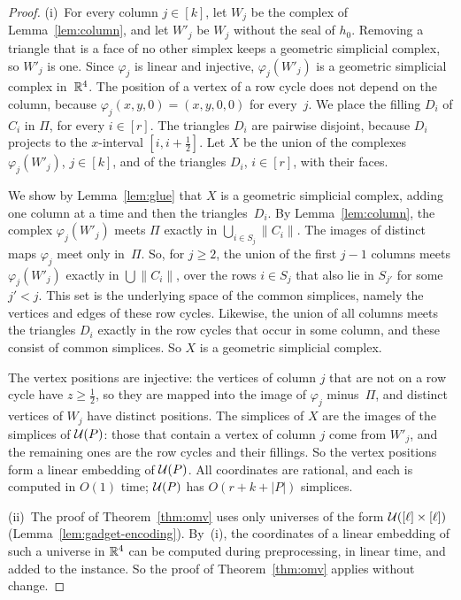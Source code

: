 \begin{proof}
(i)~For every column $j\in[k]$, let $W_j$ be the complex of Lemma~\ref{lem:column}, and let $W'_j$ be $W_j$ without the seal of $h_0$.
Removing a triangle that is a face of no other simplex keeps a geometric simplicial complex, so $W'_j$ is one.
Since $\varphi_j$ is linear and injective, $\varphi_j(W'_j)$ is a geometric simplicial complex in~$\mathbb{R}^4$.
The position of a vertex of a row cycle does not depend on the column, because $\varphi_j(x,y,0)=(x,y,0,0)$ for every~$j$.
We place the filling $D_i$ of $C_i$ in $\Pi$, for every $i\in[r]$.
The triangles $D_i$ are pairwise disjoint, because $D_i$ projects to the $x$-interval $[i,i+\frac12]$.
Let $X$ be the union of the complexes $\varphi_j(W'_j)$, $j\in[k]$, and of the triangles $D_i$, $i\in[r]$, with their faces.

We show by Lemma~\ref{lem:glue} that $X$ is a geometric simplicial complex, adding one column at a time and then the triangles~$D_i$.
By Lemma~\ref{lem:column}, the complex $\varphi_j(W'_j)$ meets $\Pi$ exactly in $\bigcup_{i\in S_j}\lVert C_i\rVert$.
The images of distinct maps $\varphi_j$ meet only in~$\Pi$.
So, for $j\ge2$, the union of the first $j-1$ columns meets $\varphi_j(W'_j)$ exactly in $\bigcup\lVert C_i\rVert$, over the rows $i\in S_j$ that also lie in $S_{j'}$ for some $j'<j$.
This set is the underlying space of the common simplices, namely the vertices and edges of these row cycles.
Likewise, the union of all columns meets the triangles $D_i$ exactly in the row cycles that occur in some column, and these consist of common simplices.
So $X$ is a geometric simplicial complex.

The vertex positions are injective: the vertices of column $j$ that are not on a row cycle have $z\ge\frac12$, so they are mapped into the image of $\varphi_j$ minus~$\Pi$, and distinct vertices of $W_j$ have distinct positions.
The simplices of $X$ are the images of the simplices of $\mathcal{U}(P)$: those that contain a vertex of column $j$ come from $W'_j$, and the remaining ones are the row cycles and their fillings.
So the vertex positions form a linear embedding of $\mathcal{U}(P)$.
All coordinates are rational, and each is computed in $O(1)$ time; $\mathcal{U}(P)$ has $O(r+k+|P|)$ simplices.

(ii)~The proof of Theorem~\ref{thm:omv} uses only universes of the form $\mathcal{U}([\ell]\times[\ell])$ (Lemma~\ref{lem:gadget-encoding}).
By~(i), the coordinates of a linear embedding of such a universe in $\mathbb{R}^4$ can be computed during preprocessing, in linear time, and added to the instance.
So the proof of Theorem~\ref{thm:omv} applies without change.
\end{proof}

